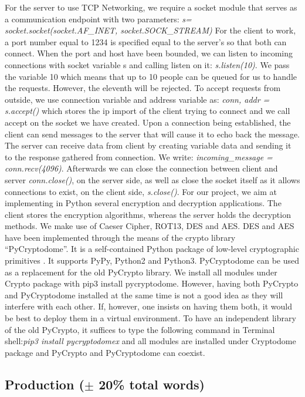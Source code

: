 For the server to use TCP Networking, we require a socket module that serves as a communication endpoint with two parameters:
\textit{s= socket.socket(socket.AF\_INET, socket.SOCK\_STREAM)}
For the client to work, a port number equal to 1234 is specified equal to the server’s so that both can connect. When the port and host have been bounded, we can listen to incoming connections with socket variable s and calling listen on it: \textit{s.listen(10)}. We pass the variable 10 which means that up to 10 people can be queued for us to handle the requests. However, the eleventh will be rejected. To accept requests from outside, we use connection variable and address variable as: \textit{conn, addr = s.accept()} which stores the ip import of the client trying to connect and we call accept on the socket we have created. Upon a connection being established, the client can send messages to the server that will cause it to echo back the message. The server can receive data from client by creating variable data and sending it to the response gathered from connection. We write: \textit{incoming\_message = conn.recv(4096)}. Afterwards we can close the connection between client and server \textit{conn.close()}, on the server side, as well as close the socket itself as it allows connections to exist, on the client side, \textit{s.close()}.
For our project, we aim at implementing in Python several encryption and decryption applications. The client stores the encryption algorithms, whereas the server holds the decryption methods. We make use of Caeser Cipher, ROT13, DES and AES.
DES and AES have been implemented through the means of the crypto library “PyCryptodome”. It is a self-contained Python package of low-level cryptographic primitives \cite{pycryptodome}. It supports PyPy, Python2 and Python3. PyCryptodome can be used as a replacement for the old PyCrypto library. We install all modules under Crypto package with pip3 install pycryptodome.  However, having both PyCrypto and PyCryptodome installed at the same time is not a good idea as they will interfere with each other. If, however, one insists on having them both, it would be best to deploy them in a virtual environment. To have an independent library of the old PyCrypto, it suffices to type the following command in Terminal shell:\textit{pip3 install pycryptodomex} and all modules are installed under Cryptodome package and PyCrypto and PyCryptodome can coexist. 


\subsection{Production ($\pm$ 20\% total words)}

